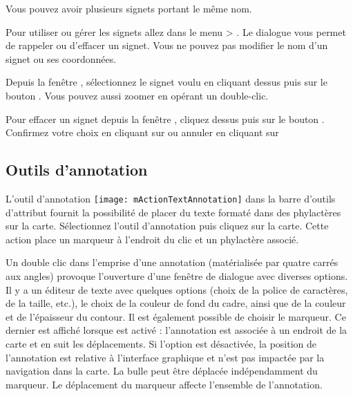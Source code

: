 Vous pouvez avoir plusieurs signets portant le même nom.

Pour utiliser ou gérer les signets allez dans le menu  > .
Le dialogue  vous permet de rappeler ou d'effacer un signet.
Vous ne pouvez pas modifier le nom d'un signet ou ses coordonnées.

Depuis la fenêtre , sélectionnez le signet voulu en cliquant dessus puis sur le bouton . Vous pouvez aussi zoomer en opérant un double-clic.

Pour effacer un signet depuis la fenêtre , cliquez dessus puis sur le bouton .
Confirmez votre choix en cliquant sur  ou annuler en cliquant sur 

\subsection{Outils d'annotation} \label{sec:annotations}

L'outil d'annotation \texttt{[image: mActionTextAnnotation]} dans la barre d'outils d'attribut fournit la possibilité de placer du texte formaté dans des phylactères sur la carte. Sélectionnez l'outil d'annotation puis cliquez sur la carte. Cette action place un marqueur à l'endroit du clic et un phylactère associé.

Un double clic dans l'emprise d'une annotation (matérialisée par quatre carrés aux angles) provoque l'ouverture d'une fenêtre de dialogue avec diverses options. Il y a un éditeur de texte avec quelques options (choix de la police de caractères, de la taille, etc.), le choix de la couleur de fond du cadre, ainsi que de la couleur et de l'épaisseur du contour. Il est également possible de choisir le marqueur. Ce dernier est affiché lorsque  est activé : l'annotation est associée à un endroit de la carte et en suit les déplacements. Si l'option est désactivée, la position de l'annotation est relative à l'interface graphique et n'est pas impactée par la navigation dans la carte. La bulle peut être déplacée indépendamment du marqueur. Le déplacement du marqueur affecte l'ensemble de l'annotation.